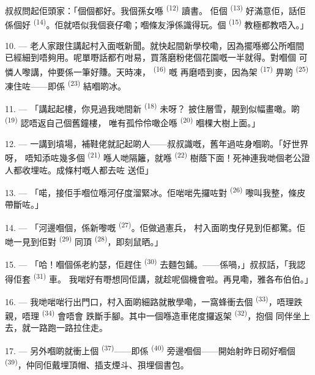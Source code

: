 叔叔問起佢頭家：「個個都好。我個孫女喺 \textsuperscript{(12)} 讀書。
佢個 \textsuperscript{(13)} 好滿意佢，話佢係個好
\textsuperscript{(14)}。佢就唔似我個衰仔嘞；嗰條友淨係識得玩。個
 \textsuperscript{(15)} 教極都教唔入。」

\VUsaut{3.0mm}
\VUsaut{3.0mm}

10. --- 老人家跟住講起村入面嘅新聞。就快起間新學校嘞，因為擺喺鄉公所嗰間
已經細到唔夠用。呢單嘢話都冇咁易，買落磨粉佬個花園嘅一半就得。對嗰個
可憐人嚟講，仲要係一筆好賺。天時凍， \textsuperscript{(16)} 嘅
再磨唔到麥，因為架 \textsuperscript{(17)} 畀啲
\textsuperscript{(25)} 凍住咗——即係 \textsuperscript{(23)} 結嗰啲冰。

11. --- 「講起起樓，你見過我哋間新 \textsuperscript{(18)} 未呀？
披住層雪，靚到似幅畫噉。啲 \textsuperscript{(19)} 認唔返自己個舊鐘樓，
唯有孤伶伶噉企喺 \textsuperscript{(20)} 嗰棵大樹上面。」

12. --- 一講到墳場，補鞋佬就記起啲人——叔叔識嘅，舊年過咗身嗰啲。「好世界呀，
唔知添咗幾多個 \textsuperscript{(21)} 喺人哋隔籬，就喺
\textsuperscript{(22)} 樹蔭下面！死神連我哋個老公證人都收埋咗。成條村嘅人都去咗
送佢」

13. --- 「喏，接佢手嗰位喺河仔度溜緊冰。佢啱啱先攞咗對
\textsuperscript{(26)} 嚟叫我整，條皮帶斷咗。」

14. --- 「河邊嗰個，係新嚟嘅 \textsuperscript{(27)}。佢做過憲兵，
村入面啲曳仔見到佢都驚。佢哋一見到佢對 \textsuperscript{(29)} 同頂
 \textsuperscript{(28)}，即刻鼠晒。」

15. --- 「哈！嗰個係老約瑟，佢趕住 \textsuperscript{(30)}
去麵包鋪。——係喎，」叔叔話，「我認得佢套 \textsuperscript{(31)} 車。
我啱好有嘢想同佢講，就趁呢個機會啦。再見嘞，雅各布伯伯。」

16. --- 我哋啱啱行出門口，村入面啲細路就散學嘞，一窩蜂衝去個
\textsuperscript{(33)}，唔理跌親，唔理 \textsuperscript{(34)} 會唔會
跌斷手腳。其中一個喺造車佬度攞返架 \textsuperscript{(32)}，抱個
同伴坐上去，就一路跑一路拉住走。

17. --- 另外嗰啲就衝上個 \textsuperscript{(37)}——即係
\textsuperscript{(40)} 旁邊嗰個——開始射昨日砌好嗰個
\textsuperscript{(39)}，仲同佢戴埋頂帽、插支煙斗、孭埋個書包。

